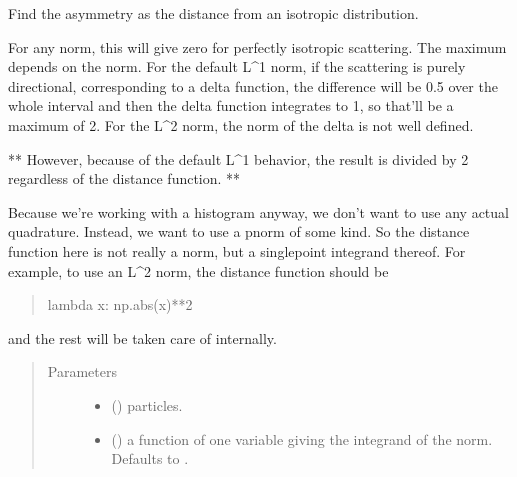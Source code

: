 \documentclass[letterpaper,10pt,english]{sphinxmanual}
\begin{document}
\begin{fulllineitems}
\label{\detokenize{analysis:scdc.analyze.norm_asymmetry}}
Find the asymmetry as the distance from an isotropic distribution.

For any norm, this will give zero for perfectly isotropic scattering. The
maximum depends on the norm. For the default L\textasciicircum{}1 norm, if the scattering is
purely directional, corresponding to a delta function, the difference will
be 0.5 over the whole interval and then the delta function integrates to 1,
so that’ll be a maximum of 2. For the L\textasciicircum{}2 norm, the norm of the delta is
not well defined.

** However, because of the default L\textasciicircum{}1 behavior, the result is divided by
2 regardless of the distance function. **

Because we’re working with a histogram anyway, we don’t want to use any
actual quadrature. Instead, we want to use a p\sphinxhyphen{}norm of some kind. So the
distance function here is not really a norm, but a single\sphinxhyphen{}point integrand
thereof. For example, to use an L\textasciicircum{}2 norm, the distance function should be
\begin{quote}

lambda x: np.abs(x)**2
\end{quote}

and the rest will be taken care of internally.
\begin{quote}\begin{description}
\item[{Parameters}] \leavevmode\begin{itemize}
\item {} 
 () \textendash{} particles.

\item {} 
 (\sphinxstyleliteralemphasis{\sphinxupquote{, }}) \textendash{} a function of one variable
giving the integrand of the norm. Defaults to .


\end{itemize}
\end{description}
\end{quote}
\end{fulllineitems}
\end{document}
